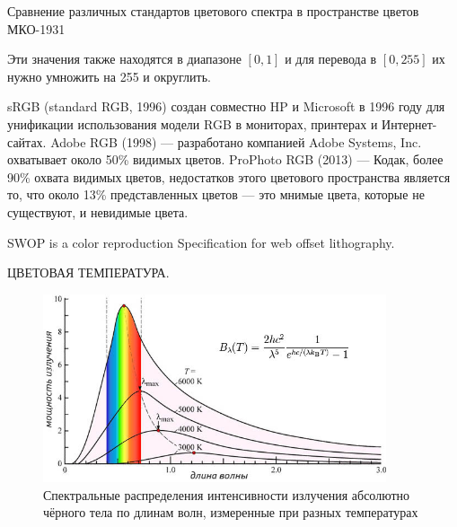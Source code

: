 \documentclass{beamer}
\begin{document}
\begin{frame}{Сравнение различных стандартов цветового спектра в пространстве цветов МКО-1931}
{{					Эти значения также находятся в диапазоне $[0, 1]$ и для перевода в $[0, 255]$ их нужно умножить на 255 и округлить.

					sRGB (standard RGB, 1996) создан совместно HP и Microsoft в 1996 году для унификации использования модели RGB в мониторах, принтерах и Интернет-сайтах.
					Adobe RGB (1998) --- разработано компанией Adobe Systems, Inc. охватывает около 50\% видимых цветов.
					ProPhoto RGB (2013)  --- Кодак, более 90\% охвата видимых цветов, недостатков этого цветового пространства является то, что около 13\% представленных цветов — это мнимые цвета, которые не существуют, и невидимые цвета.
					
					SWOP is a color reproduction Specification for web offset lithography.
}
		}
	\end{frame}

	\begin{frame}{ЦВЕТОВАЯ ТЕМПЕРАТУРА. }
		\begin{figure}
			\includegraphics[width=0.9\textwidth]{images/Спектральное-распределение-излучения-абсолютно-черного-тела.jpg}
			\caption{
				Спектральные распределения интенсивности излучения абсолютно чёрного тела по длинам волн, измеренные при разных температурах
				}
		\end{figure}
	\end{frame}
\end{document}

